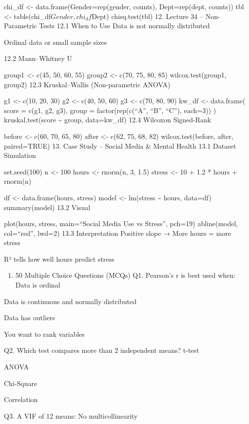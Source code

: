 \documentclass[
  letterpaper,
  DIV=11,
  numbers=noendperiod]{scrreprt}
\providecommand{\tightlist}{%
  \setlength{\itemsep}{0pt}\setlength{\parskip}{0pt}}
\begin{document}
chi\_df \textless- data.frame(Gender=rep(gender, counts), Dept=rep(dept,
counts)) tbl \textless- table(chi\_df\(Gender, chi_df\)Dept)
chisq.test(tbl) 12. Lecture 34 -- Non-Parametric Tests 12.1 When to Use
Data is not normally distributed

Ordinal data or small sample sizes

12.2 Mann--Whitney U

group1 \textless- c(45, 50, 60, 55) group2 \textless- c(70, 75, 80, 85)
wilcox.test(group1, group2) 12.3 Kruskal--Wallis (Non-parametric ANOVA)

g1 \textless- c(10, 20, 30) g2 \textless- c(40, 50, 60) g3 \textless-
c(70, 80, 90) kw\_df \textless- data.frame( score = c(g1, g2, g3), group
= factor(rep(c(``A'', ``B'', ``C''), each=3)) ) kruskal.test(score
\textasciitilde{} group, data=kw\_df) 12.4 Wilcoxon Signed-Rank

before \textless- c(60, 70, 65, 80) after \textless- c(62, 75, 68, 82)
wilcox.test(before, after, paired=TRUE) 13. Case Study -- Social Media
\& Mental Health 13.1 Dataset Simulation

set.seed(100) n \textless- 100 hours \textless- rnorm(n, 3, 1.5) stress
\textless- 10 + 1.2 * hours + rnorm(n)

df \textless- data.frame(hours, stress) model \textless- lm(stress
\textasciitilde{} hours, data=df) summary(model) 13.2 Visual

plot(hours, stress, main=``Social Media Use vs Stress'', pch=19)
abline(model, col=``red'', lwd=2) 13.3 Interpretation Positive slope →
More hours = more stress

R² tells how well hours predict stress

\begin{enumerate}
\def\labelenumi{\arabic{enumi}.}
\setcounter{enumi}{13}
\tightlist
\item
  50 Multiple Choice Questions (MCQs) Q1. Pearson's r is best used when:
  Data is ordinal
\end{enumerate}

Data is continuous and normally distributed

Data has outliers

You want to rank variables

Q2. Which test compares more than 2 independent means? t-test

ANOVA

Chi-Square

Correlation

Q3. A VIF of 12 means: No multicollinearity
\end{document}
